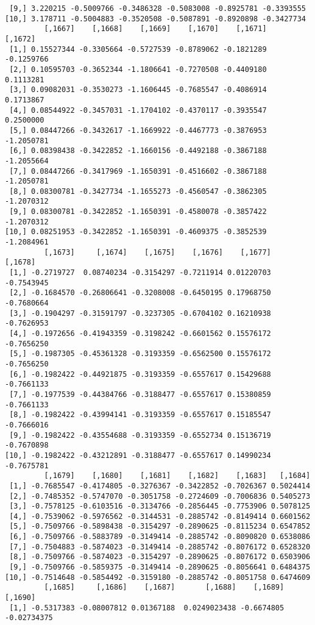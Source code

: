 \documentclass[
  letterpaper,
  DIV=11,
  numbers=noendperiod]{scrreprt}
\begin{document}
\begin{verbatim}
 [9,] 3.220215 -0.5009766 -0.3486328 -0.5083008 -0.8925781 -0.3393555
[10,] 3.178711 -0.5004883 -0.3520508 -0.5087891 -0.8920898 -0.3427734
         [,1667]    [,1668]    [,1669]    [,1670]    [,1671]    [,1672]
 [1,] 0.15527344 -0.3305664 -0.5727539 -0.8789062 -0.1821289 -0.1259766
 [2,] 0.10595703 -0.3652344 -1.1806641 -0.7270508 -0.4409180  0.1113281
 [3,] 0.09082031 -0.3530273 -1.1606445 -0.7685547 -0.4086914  0.1713867
 [4,] 0.08544922 -0.3457031 -1.1704102 -0.4370117 -0.3935547  0.2500000
 [5,] 0.08447266 -0.3432617 -1.1669922 -0.4467773 -0.3876953 -1.2050781
 [6,] 0.08398438 -0.3422852 -1.1660156 -0.4492188 -0.3867188 -1.2055664
 [7,] 0.08447266 -0.3417969 -1.1650391 -0.4516602 -0.3867188 -1.2050781
 [8,] 0.08300781 -0.3427734 -1.1655273 -0.4560547 -0.3862305 -1.2070312
 [9,] 0.08300781 -0.3422852 -1.1650391 -0.4580078 -0.3857422 -1.2070312
[10,] 0.08251953 -0.3422852 -1.1650391 -0.4609375 -0.3852539 -1.2084961
         [,1673]     [,1674]    [,1675]    [,1676]    [,1677]    [,1678]
 [1,] -0.2719727  0.08740234 -0.3154297 -0.7211914 0.01220703 -0.7543945
 [2,] -0.1684570 -0.26806641 -0.3208008 -0.6450195 0.17968750 -0.7680664
 [3,] -0.1904297 -0.31591797 -0.3237305 -0.6704102 0.16210938 -0.7626953
 [4,] -0.1972656 -0.41943359 -0.3198242 -0.6601562 0.15576172 -0.7656250
 [5,] -0.1987305 -0.45361328 -0.3193359 -0.6562500 0.15576172 -0.7656250
 [6,] -0.1982422 -0.44921875 -0.3193359 -0.6557617 0.15429688 -0.7661133
 [7,] -0.1977539 -0.44384766 -0.3188477 -0.6557617 0.15380859 -0.7661133
 [8,] -0.1982422 -0.43994141 -0.3193359 -0.6557617 0.15185547 -0.7666016
 [9,] -0.1982422 -0.43554688 -0.3193359 -0.6552734 0.15136719 -0.7670898
[10,] -0.1982422 -0.43212891 -0.3188477 -0.6557617 0.14990234 -0.7675781
         [,1679]    [,1680]    [,1681]    [,1682]    [,1683]   [,1684]
 [1,] -0.7685547 -0.4174805 -0.3276367 -0.3422852 -0.7026367 0.5024414
 [2,] -0.7485352 -0.5747070 -0.3051758 -0.2724609 -0.7006836 0.5405273
 [3,] -0.7578125 -0.6103516 -0.3134766 -0.2856445 -0.7753906 0.5078125
 [4,] -0.7539062 -0.5976562 -0.3144531 -0.2885742 -0.8149414 0.6601562
 [5,] -0.7509766 -0.5898438 -0.3154297 -0.2890625 -0.8115234 0.6547852
 [6,] -0.7509766 -0.5883789 -0.3149414 -0.2885742 -0.8090820 0.6538086
 [7,] -0.7504883 -0.5874023 -0.3149414 -0.2885742 -0.8076172 0.6528320
 [8,] -0.7509766 -0.5874023 -0.3154297 -0.2890625 -0.8076172 0.6503906
 [9,] -0.7509766 -0.5859375 -0.3149414 -0.2890625 -0.8056641 0.6484375
[10,] -0.7514648 -0.5854492 -0.3159180 -0.2885742 -0.8051758 0.6474609
         [,1685]     [,1686]    [,1687]       [,1688]    [,1689]     [,1690]
 [1,] -0.5317383 -0.08007812 0.01367188  0.0249023438 -0.6674805 -0.02734375

\end{verbatim}
\end{document}
